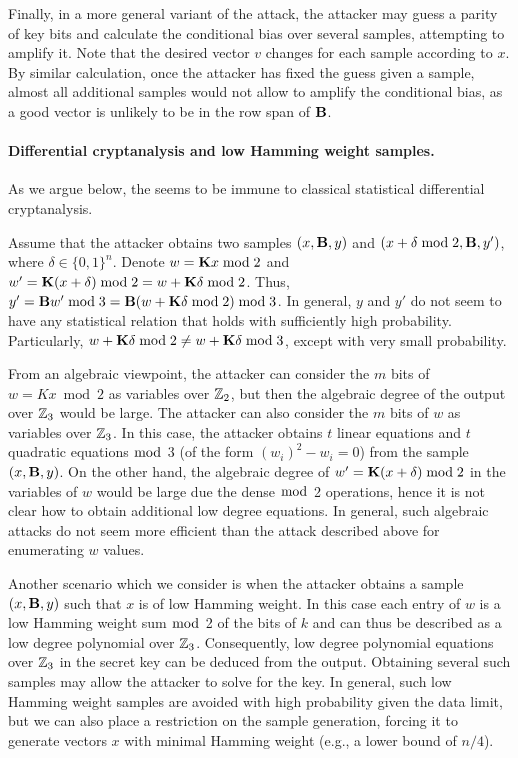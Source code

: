 Finally, in a more general variant of the attack,
the attacker may guess a parity of key bits and calculate the conditional bias over several samples,
attempting to amplify it.
Note that the desired vector $v$ changes for each sample according to $x$.
By similar calculation, once the attacker has fixed the guess given a sample,
almost all additional samples would not allow to amplify the conditional bias,
as a good vector is unlikely to be in the row span of $\mat{B}$.

\paragraph{Differential cryptanalysis and low Hamming weight samples.}
As we argue below, the \ttwPRF seems to be immune to classical statistical differential cryptanalysis.

Assume that the attacker obtains two samples $(x,\mat{B},y)$ and $(x+\delta \bmod 2,\mat{B},y')$, where $\delta \in \{0,1\}^n$.
Denote $w = \mat{K} x \bmod 2$ and $w' = \mat{K} (x + \delta) \bmod 2 = w + \mat{K} \delta \bmod 2$.
Thus, $y' = \mat{B} w' \bmod 3 = \mat{B} (w + \mat{K} \delta \bmod 2 ) \bmod 3$.
In general, $y$ and $y'$ do not seem to have any statistical relation that holds with sufficiently high probability.
Particularly, $w + \mat{K} \delta \bmod 2 \neq w + \mat{K} \delta \bmod 3$,
except with very small probability.

From an algebraic viewpoint, the attacker can consider the $m$ bits of $w = K x \bmod 2$ as variables over $\mathbb{Z}_2$,
but then the algebraic degree of the output over $\mathbb{Z}_3$ would be large.
The attacker can also consider the $m$ bits of $w$ as variables over $\mathbb{Z}_3$.
In this case, the attacker obtains $t$ linear equations and $t$ quadratic equations $\bmod$ 3 (of the form $(w_i)^2 - w_i = 0$) from the sample $(x,\mat{B},y)$.
On the other hand, the algebraic degree of $w' = \mat{K} (x +\delta) \bmod 2$ in the variables of $w$ would be large due the dense $\bmod$ 2 operations,
hence it is not clear how to obtain additional low degree equations.
In general, such algebraic attacks do not seem more efficient than the attack described above for enumerating $w$ values.

Another scenario which we consider is when the attacker obtains a sample $(x,\mat{B},y)$
such that $x$ is of low Hamming weight. In this case each entry of $w$ is a low Hamming weight sum $\bmod$ 2
of the bits of $k$ and can thus be described as a low degree polynomial over $\mathbb{Z}_3$.
Consequently, low degree polynomial equations over $\mathbb{Z}_3$ in the secret key can be deduced from the output.
Obtaining several such samples may allow the attacker to solve for the key.
In general, such low Hamming weight samples are avoided with high probability given the data limit,
but we can also place a restriction on the sample generation, forcing it to generate vectors $x$
with minimal Hamming weight (e.g., a lower bound of $n/4$).


